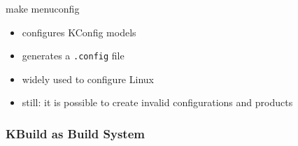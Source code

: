 \begin{frame}{\myframetitle}
	\begin{fancycolumns}[widths={60,40}]
		\begin{exampletight}{}
		\end{exampletight}
	\nextcolumn
		\begin{note}{make menuconfig}
			\begin{itemize}
				\item configures KConfig models
				\item generates a \texttt{.config} file
				\item widely used to configure Linux
				\item still: it is possible to create invalid configurations and products %
			\end{itemize}
		\end{note}
	\end{fancycolumns}
\end{frame}

\subsubsection*{KBuild as Build System}

